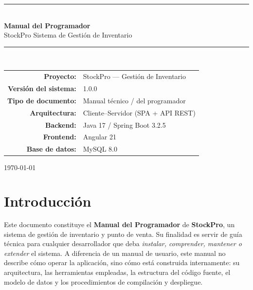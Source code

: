 \documentclass[11pt,a4paper]{article}
\begin{document}
\begin{titlepage}
    \centering
    \vspace*{1.5cm}

    {\color{azulcorp}\rule{\linewidth}{1.2pt}}\\[0.4cm]
    {\Huge\bfseries\color{azulcorp} Manual del Programador}\\[0.3cm]
    {\LARGE StockPro \textemdash{} Sistema de Gestión de Inventario}\\[0.2cm]
    {\color{azulcorp}\rule{\linewidth}{1.2pt}}\\[1.5cm]

    \vfill

    {\large
    \begin{tabular}{rl}
        \textbf{Proyecto:} & StockPro --- Gestión de Inventario \\[4pt]
        \textbf{Versión del sistema:} & 1.0.0 \\[4pt]
        \textbf{Tipo de documento:} & Manual técnico / del programador \\[4pt]
        \textbf{Arquitectura:} & Cliente--Servidor (SPA + API REST) \\[4pt]
        \textbf{Backend:} & Java 17 / Spring Boot 3.2.5 \\[4pt]
        \textbf{Frontend:} & Angular 21 \\[4pt]
        \textbf{Base de datos:} & MySQL 8.0 \\[4pt]
    \end{tabular}
    }

    \vfill

    {\large \today}

\end{titlepage}

\tableofcontents
\newpage

\section{Introducción}

Este documento constituye el \textbf{Manual del Programador} de
\textbf{StockPro}, un sistema de gestión de inventario y punto de venta. Su
finalidad es servir de guía técnica para
cualquier desarrollador que deba \emph{instalar, comprender, mantener o
extender} el sistema. A diferencia de un manual de usuario, este manual no
describe cómo operar la aplicación, sino cómo está construida internamente:
su arquitectura, las herramientas empleadas, la estructura del código fuente,
el modelo de datos y los procedimientos de compilación y despliegue.
\end{document}
